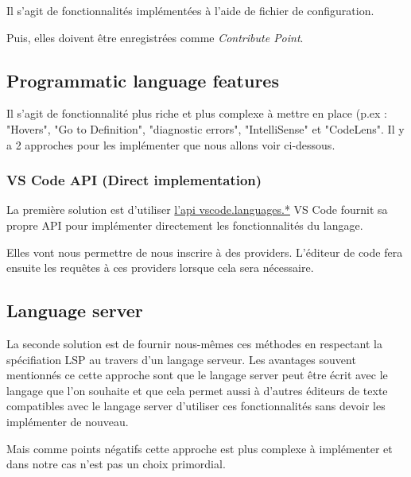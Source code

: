 \documentclass[
    iict, %
    il, %
]{heig-tb}
\begin{document}
Il s'agit de fonctionnalités implémentées à l'aide de fichier de configuration.

Puis, elles doivent être enregistrées comme \emph{Contribute Point}.

\subsection{Programmatic language features}\label{Programmatic language features}
Il s'agit de fonctionnalité plus riche et plus complexe à mettre en place (p.ex : "Hovers", "Go to Definition", "diagnostic errors", "IntelliSense" \space et "CodeLens".
Il y a 2 approches pour les implémenter que nous allons voir ci-dessous.

\subsubsection{VS Code API (Direct implementation)}
La première solution est d'utiliser \href{https://code.visualstudio.com/api/references/vscode-api#languages}{l'api vscode.languages.*}
VS Code fournit sa propre API pour implémenter directement les fonctionnalités du langage.

Elles vont nous permettre de nous inscrire à des providers. L'éditeur de code fera ensuite les requêtes à ces providers lorsque cela sera nécessaire.


\subsection{Language server}


La seconde solution est de fournir nous-mêmes ces méthodes en respectant la spécifiation LSP \cite{lsp-specification} au travers d'un langage serveur.
Les avantages souvent mentionnés ce cette approche sont que le langage server peut être écrit avec le langage que l'on souhaite et
que cela permet aussi à d'autres éditeurs de texte compatibles avec le langage server d'utiliser ces fonctionnalités sans devoir les implémenter de nouveau.

Mais comme points négatifs cette approche est plus complexe à implémenter et dans notre cas n'est pas un choix primordial.
\end{document}
